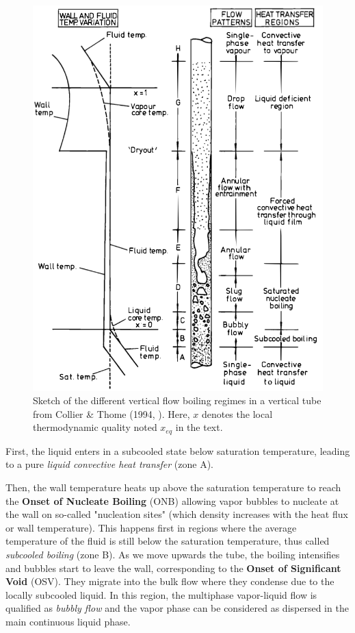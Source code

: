 \begin{figure}[!h]
\centering
\includegraphics[width=0.6\linewidth]{img/intro/boiling_collier.png}
\caption{Sketch of the different vertical flow boiling regimes in a vertical tube from Collier \& Thome (1994, \cite{collier_1994}). Here, $x$ denotes the local thermodynamic quality noted $x_{eq}$ in the text. }
\label{fig:boiling_collier}
\end{figure}


\npar


First, the liquid enters in a subcooled state \ie below saturation temperature, leading to a pure \textit{liquid convective heat transfer} (zone A).

\npar

Then, the wall temperature heats up above the saturation temperature to reach the \textbf{Onset of Nucleate Boiling} (ONB) allowing vapor bubbles to nucleate at the wall on so-called "nucleation sites" (which density increases with the heat flux or wall temperature). This happens first in regions where the average temperature of the fluid is still below the saturation temperature, thus called \textit{subcooled boiling} (zone B). As we move upwards the tube, the boiling intensifies and bubbles start to leave the wall, corresponding to the \textbf{Onset of Significant Void} (OSV). They migrate into the bulk flow where they condense due to the locally subcooled liquid. In this region, the multiphase vapor-liquid flow is qualified as \textit{bubbly flow} and the vapor phase can be considered as dispersed in the main continuous liquid phase.

